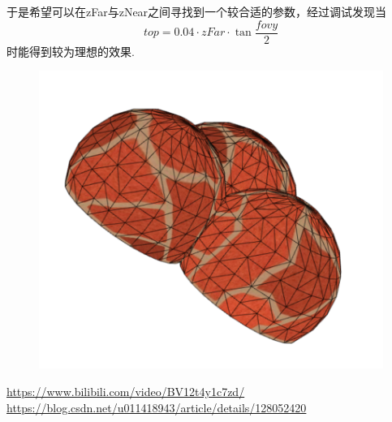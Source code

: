 \documentclass[12pt]{article}
\begin{document}
于是希望可以在zFar与zNear之间寻找到一个较合适的参数，经过调试发现当$$top=0.04\cdot zFar\cdot \tan\frac{fovy}{2}$$时能得到较为理想的效果.

\newpage

\begin{figure}[htbp]
    \centering
    \includegraphics[scale=0.5]{pic05.png}
\end{figure}


\begin{thebibliography}{3}
     \url{https://www.bilibili.com/video/BV12t4y1c7zd/}
     \url{https://blog.csdn.net/u011418943/article/details/128052420}
\end{thebibliography}
\end{document}
